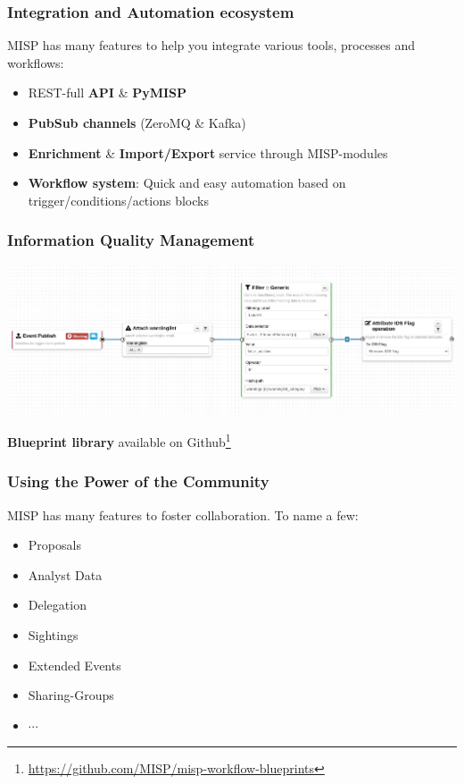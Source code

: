 \begin{frame}
    \frametitle{Integration and Automation ecosystem}
    MISP has many features to help you integrate various tools, processes and workflows:
    \begin{itemize}
        \item REST-full \textbf{API} \& \textbf{PyMISP}
        \item \textbf{PubSub channels} (ZeroMQ \& Kafka)
        \item \textbf{Enrichment} \& \textbf{Import/Export} service through MISP-modules
        \item \textbf{Workflow system}: Quick and easy automation based on trigger/conditions/actions blocks
    \end{itemize}
\end{frame}

\begin{frame}
    \frametitle{Information Quality Management}
    \begin{center}
        \includegraphics[width=0.99\linewidth]{wf-false-positive.png}
    \end{center}
    \begin{center}
        \textbf{Blueprint library} available on Github\footnote{\url{https://github.com/MISP/misp-workflow-blueprints}}
    \end{center}
\end{frame}

\begin{frame}
    \frametitle{Using the Power of the Community}
    MISP has many features to foster collaboration. To name a few:
    \begin{itemize}
        \item Proposals
        \item Analyst Data
        \item Delegation
        \item Sightings
        \item Extended Events
        \item Sharing-Groups
        \item $\cdots$
    \end{itemize}
\end{frame}


